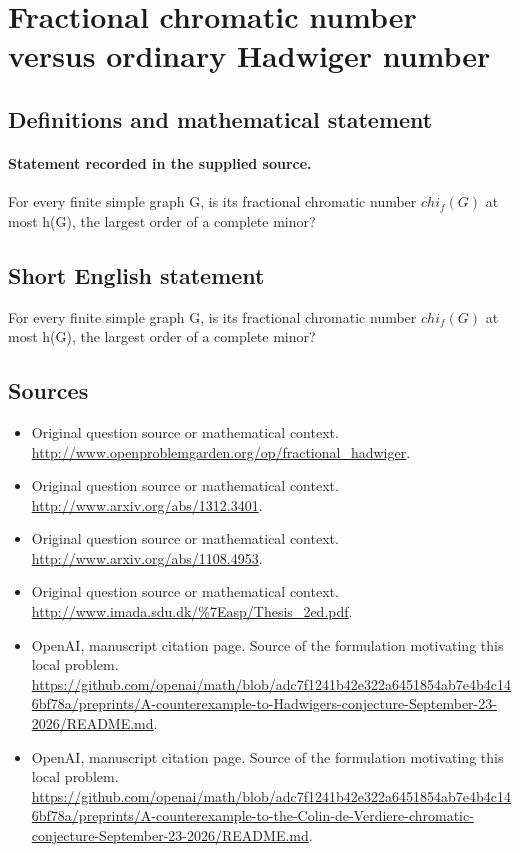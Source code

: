 \documentclass[11pt]{article}
\begin{document}
\section*{Fractional chromatic number versus ordinary Hadwiger number}\label{statement}
\subsection{Definitions and mathematical statement}
\paragraph{Statement recorded in the supplied source.}
For every finite simple graph G, is its fractional chromatic number $chi_f(G)$ at most h(G), the largest order of a complete minor?
\subsection{Short English statement}
For every finite simple graph G, is its fractional chromatic number $chi_f(G)$ at most h(G), the largest order of a complete minor?
\subsection{Sources}
\begin{itemize}
\item[S1] Original question source or mathematical context.
\url{http://www.openproblemgarden.org/op/fractional_hadwiger}.
\item[S2] Original question source or mathematical context.
\url{http://www.arxiv.org/abs/1312.3401}.
\item[S3] Original question source or mathematical context.
\url{http://www.arxiv.org/abs/1108.4953}.
\item[S4] Original question source or mathematical context.
\url{http://www.imada.sdu.dk/%7Easp/Thesis_2ed.pdf}.
\item[S5] OpenAI, manuscript citation page. Source of the formulation motivating this local problem.
\url{https://github.com/openai/math/blob/adc7f1241b42e322a6451854ab7e4b4c146bf78a/preprints/A-counterexample-to-Hadwigers-conjecture-September-23-2026/README.md}.
\item[S6] OpenAI, manuscript citation page. Source of the formulation motivating this local problem.
\url{https://github.com/openai/math/blob/adc7f1241b42e322a6451854ab7e4b4c146bf78a/preprints/A-counterexample-to-the-Colin-de-Verdiere-chromatic-conjecture-September-23-2026/README.md}.
\end{itemize}
\end{document}
